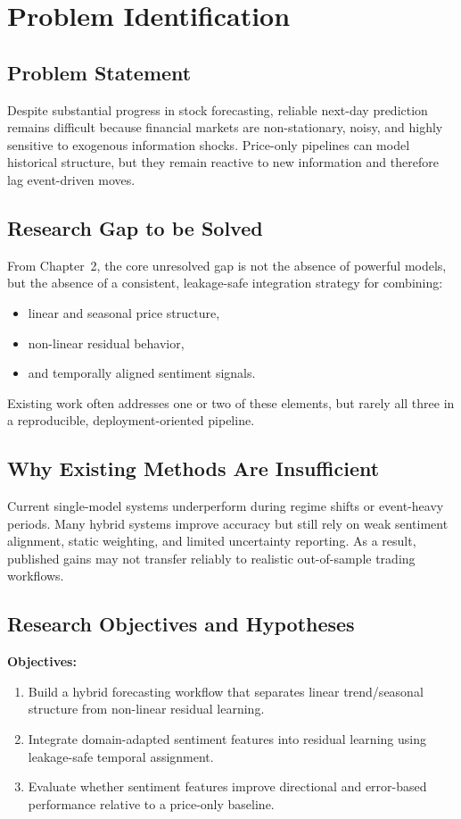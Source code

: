 \documentclass[12pt,a4paper]{article}
\begin{document}
\newpage

\section{Problem Identification}

\subsection{Problem Statement}
Despite substantial progress in stock forecasting, reliable next-day prediction remains difficult because financial markets are non-stationary, noisy, and highly sensitive to exogenous information shocks. Price-only pipelines can model historical structure, but they remain reactive to new information and therefore lag event-driven moves.

\subsection{Research Gap to be Solved}
From Chapter~2, the core unresolved gap is not the absence of powerful models, but the absence of a consistent, leakage-safe integration strategy for combining:
\begin{itemize}
    \item linear and seasonal price structure,
    \item non-linear residual behavior,
    \item and temporally aligned sentiment signals.
\end{itemize}
Existing work often addresses one or two of these elements, but rarely all three in a reproducible, deployment-oriented pipeline.

\subsection{Why Existing Methods Are Insufficient}
Current single-model systems underperform during regime shifts or event-heavy periods. Many hybrid systems improve accuracy but still rely on weak sentiment alignment, static weighting, and limited uncertainty reporting. As a result, published gains may not transfer reliably to realistic out-of-sample trading workflows.

\subsection{Research Objectives and Hypotheses}
\textbf{Objectives:}
\begin{enumerate}
    \item Build a hybrid forecasting workflow that separates linear trend/seasonal structure from non-linear residual learning.
    \item Integrate domain-adapted sentiment features into residual learning using leakage-safe temporal assignment.
    \item Evaluate whether sentiment features improve directional and error-based performance relative to a price-only baseline.
\end{enumerate}
\end{document}
